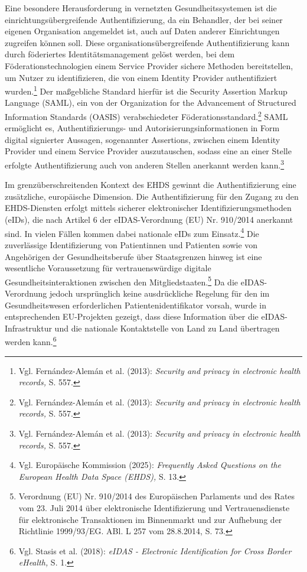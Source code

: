 Eine besondere Herausforderung in vernetzten Gesundheitssystemen ist die einrichtungsübergreifende Authentifizierung, da ein Behandler, der bei seiner eigenen Organisation angemeldet ist, auch auf Daten anderer Einrichtungen zugreifen können soll. Diese organisationsübergreifende Authentifizierung kann durch föderiertes Identitätsmanagement gelöst werden, bei dem Föderationstechnologien einem Service Provider sichere Methoden bereitstellen, um Nutzer zu identifizieren, die von einem Identity Provider authentifiziert wurden.\footnote{Vgl. Fernández-Alemán et al. (2013):  \textit{Security and privacy in electronic health records,} S. 557.} Der maßgebliche Standard hierfür ist die Security Assertion Markup Language (SAML), ein von der Organization for the Advancement of Structured Information Standards (OASIS) verabschiedeter Föderationsstandard.\footnote{Vgl. Fernández-Alemán et al. (2013):  \textit{Security and privacy in electronic health records,} S. 557.} SAML ermöglicht es, Authentifizierungs- und Autorisierungsinformationen in Form digital signierter Aussagen, sogenannter Assertions, zwischen einem Identity Provider und einem Service Provider auszutauschen, sodass eine an einer Stelle erfolgte Authentifizierung auch von anderen Stellen anerkannt werden kann.\footnote{Vgl. Fernández-Alemán et al. (2013):  \textit{Security and privacy in electronic health records,} S. 557.}

Im grenzüberschreitenden Kontext des EHDS gewinnt die Authentifizierung eine zusätzliche, europäische Dimension. Die Authentifizierung für den Zugang zu den EHDS-Diensten erfolgt mittels sicherer elektronischer Identifizierungsmethoden (eIDs), die nach Artikel 6 der eIDAS-Verordnung (EU) Nr. 910/2014 anerkannt sind. In vielen Fällen kommen dabei nationale eIDs zum Einsatz.\footnote{Vgl. Europäische Kommission (2025):  \textit{Frequently Asked Questions on the European Health Data Space (EHDS),} S. 13.}
Die zuverlässige Identifizierung von Patientinnen und Patienten sowie von Angehörigen der Gesundheitsberufe über Staatsgrenzen hinweg ist eine wesentliche Voraussetzung für vertrauenswürdige digitale Gesundheitsinteraktionen zwischen den Mitgliedstaaten.\footnote{{Verordnung (EU) Nr. 910/2014 des Europäischen Parlaments und des Rates vom 23. Juli 2014 über elektronische Identifizierung und Vertrauensdienste für elektronische Transaktionen im Binnenmarkt und zur Aufhebung der Richtlinie 1999/93/EG.} ABl. L 257 vom 28.8.2014, S. 73.} Da die eIDAS-Verordnung jedoch ursprünglich keine ausdrückliche Regelung für den im Gesundheitswesen erforderlichen Patientenidentifikator vorsah, wurde in entsprechenden EU-Projekten gezeigt, dass diese Information über die eIDAS-Infrastruktur und die nationale Kontaktstelle von Land zu Land übertragen werden kann.\footnote{Vgl. Stasis et al. (2018):  \textit{eIDAS - Electronic Identification for Cross Border eHealth,} S. 1.}


